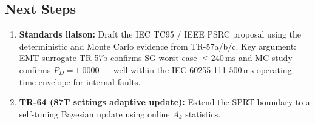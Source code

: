 \documentclass[11pt, a4paper]{article}
\newcommand{\Ak}{A_k}
\newcommand{\ms}{\,\text{ms}}
\begin{document}
\subsection{Next Steps}

\begin{enumerate}
  \item \textbf{Standards liaison:} Draft the IEC TC95 / IEEE PSRC proposal
    using the deterministic and Monte Carlo evidence from TR-57a/b/c.
    Key argument: EMT-surrogate TR-57b confirms SG worst-case $\leq 240\ms$
    and MC study confirms $P_D=1.0000$ — well within the IEC 60255-111
    $500\ms$ operating time envelope for internal faults.
  \item \textbf{TR-64 (87T settings adaptive update):} Extend the SPRT
    boundary to a self-tuning Bayesian update using online $\Ak$ statistics.
\end{enumerate}



\end{document}
